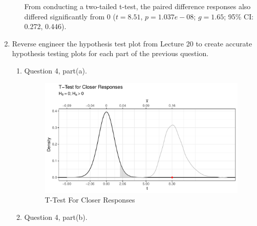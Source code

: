 \documentclass{article}\usepackage[]{graphicx}\usepackage[]{xcolor}
\makeatletter
\def\maxwidth{ %
  \ifdim\Gin@nat@width>\linewidth
    \linewidth
  \else
    \Gin@nat@width
  \fi
}
\newenvironment{knitrout}{}{} %
\makeatother
\begin{document}
\begin{enumerate}
\begin{enumerate}
From conducting a two-tailed t-test, the paired difference responses also differed significantly from 0 ($t=8.51$, $p = 1.037e-08$; $g=1.65  $; 95\% CI: 0.272, 0.446).  
  
\end{enumerate}
\item Reverse engineer the hypothesis test plot from Lecture 20 to create accurate
hypothesis testing plots for each part of the previous question.
\begin{enumerate}
  \item Question 4, part(a).

\begin{figure}[H]
\begin{center}
\begin{knitrout}
\color{fgcolor}

{\centering \includegraphics[width=\maxwidth]{figure/unnamed-chunk-17-1} 

}


\end{knitrout}
\caption{T-Test For Closer Responses}
\label{plot2} 
\end{center}
\end{figure}



  \item Question 4, part(b).

\begin{figure}[H]
\begin{center}
\begin{knitrout}
\color{fgcolor}


\end{knitrout}
\end{center}
\end{figure}
\end{enumerate}
\end{enumerate}
\end{document}
